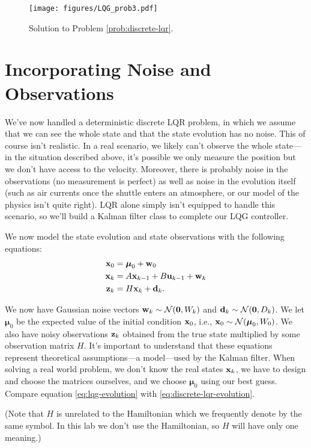 \begin{figure}
    \centering
    \texttt{[image: figures/LQG\_prob3.pdf]}
    \caption{Solution to Problem \ref{prob:discrete-lqr}.}
    \label{fig:prob-discrete-lqr}
\end{figure}

\section*{Incorporating Noise and Observations}

We've now handled a deterministic discrete LQR problem, in which we assume that we can see the whole state and that the state evolution has no noise.
This of course isn't realistic.
In a real scenario, we likely can't observe the whole state---in the situation described above, it's possible we only measure the position but we don't have access to the velocity.
Moreover, there is probably noise in the observations (no measurement is perfect) as well as noise in the evolution itself (such as air currents once the shuttle enters an atmosphere, or our model of the physics isn't quite right).
LQR alone simply isn't equipped to handle this scenario, so we'll build a Kalman filter class to complete our LQG controller.

We now model the state evolution and state observations with the following equations:
\begin{align}
\mathbf{x}_0 &= \boldsymbol \mu_0 + \mathbf{w}_0\\
\label{eq:lqg-evolution}
\mathbf{x}_k &= A \mathbf{x}_{k-1} + B \mathbf{u}_{k-1} + \mathbf{w}_k\\
\label{eq:lqg-observation}
\mathbf{z}_k &= H \mathbf{x}_k + \mathbf d_k.
\end{align}

We now have Gaussian noise vectors $\mathbf{w}_k \sim \mathcal N(\mathbf{0}, W_k)$ and $\mathbf d_k \sim \mathcal N(\mathbf{0}, D_k)$.
We let $\boldsymbol \mu_0$ be the expected value of the initial condition $\mathbf{x}_0$, i.e., $\mathbf{x}_0 \sim \mathcal N(\boldsymbol \mu_0, W_0)$.
We also have noisy observations $\mathbf{z}_k$ obtained from the true state multiplied by some observation matrix $H$.
It's important to understand that these equations represent theoretical assumptions---a model---used by the Kalman filter.
When solving a real world problem, we don't know the real states $\mathbf{x}_k$, we have to design and choose the matrices ourselves, and we choose $\boldsymbol \mu_0$ using our best guess.
Compare equation \eqref{eq:lqg-evolution} with \eqref{eq:discrete-lqr-evolution}.

(Note that $H$ is unrelated to the Hamiltonian which we frequently denote by the same symbol.
In this lab we don't use the Hamiltonian, so $H$ will have only one meaning.)


